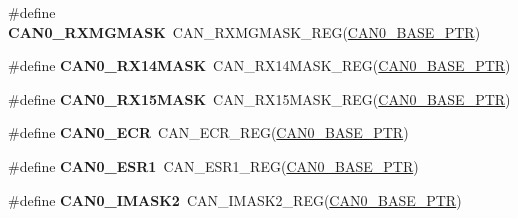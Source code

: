 \begin{DoxyCompactItemize}
\item 
\hypertarget{group___c_a_n___register___accessor___macros_gae7f04079ef57decb7b0b43b704239ba2}{}\#define {\bfseries C\+A\+N0\+\_\+\+R\+X\+M\+G\+M\+A\+S\+K}~C\+A\+N\+\_\+\+R\+X\+M\+G\+M\+A\+S\+K\+\_\+\+R\+E\+G(\hyperlink{group___c_a_n___peripheral_ga1ee8f499e10af9b8e3132e0168e519b9}{C\+A\+N0\+\_\+\+B\+A\+S\+E\+\_\+\+P\+T\+R})\label{group___c_a_n___register___accessor___macros_gae7f04079ef57decb7b0b43b704239ba2}

\item 
\hypertarget{group___c_a_n___register___accessor___macros_gaec0eee2119e6a8629942406dc321a657}{}\#define {\bfseries C\+A\+N0\+\_\+\+R\+X14\+M\+A\+S\+K}~C\+A\+N\+\_\+\+R\+X14\+M\+A\+S\+K\+\_\+\+R\+E\+G(\hyperlink{group___c_a_n___peripheral_ga1ee8f499e10af9b8e3132e0168e519b9}{C\+A\+N0\+\_\+\+B\+A\+S\+E\+\_\+\+P\+T\+R})\label{group___c_a_n___register___accessor___macros_gaec0eee2119e6a8629942406dc321a657}

\item 
\hypertarget{group___c_a_n___register___accessor___macros_ga855803ccca3adf54f65e1e2c4d219680}{}\#define {\bfseries C\+A\+N0\+\_\+\+R\+X15\+M\+A\+S\+K}~C\+A\+N\+\_\+\+R\+X15\+M\+A\+S\+K\+\_\+\+R\+E\+G(\hyperlink{group___c_a_n___peripheral_ga1ee8f499e10af9b8e3132e0168e519b9}{C\+A\+N0\+\_\+\+B\+A\+S\+E\+\_\+\+P\+T\+R})\label{group___c_a_n___register___accessor___macros_ga855803ccca3adf54f65e1e2c4d219680}

\item 
\hypertarget{group___c_a_n___register___accessor___macros_gae5c1b27d66a19078c1a9bb64376d2b3f}{}\#define {\bfseries C\+A\+N0\+\_\+\+E\+C\+R}~C\+A\+N\+\_\+\+E\+C\+R\+\_\+\+R\+E\+G(\hyperlink{group___c_a_n___peripheral_ga1ee8f499e10af9b8e3132e0168e519b9}{C\+A\+N0\+\_\+\+B\+A\+S\+E\+\_\+\+P\+T\+R})\label{group___c_a_n___register___accessor___macros_gae5c1b27d66a19078c1a9bb64376d2b3f}

\item 
\hypertarget{group___c_a_n___register___accessor___macros_ga0fe27c46961bb993d85c1993bcc7717b}{}\#define {\bfseries C\+A\+N0\+\_\+\+E\+S\+R1}~C\+A\+N\+\_\+\+E\+S\+R1\+\_\+\+R\+E\+G(\hyperlink{group___c_a_n___peripheral_ga1ee8f499e10af9b8e3132e0168e519b9}{C\+A\+N0\+\_\+\+B\+A\+S\+E\+\_\+\+P\+T\+R})\label{group___c_a_n___register___accessor___macros_ga0fe27c46961bb993d85c1993bcc7717b}

\item 
\hypertarget{group___c_a_n___register___accessor___macros_ga711eb2e225261d9a6dcdae328d42812f}{}\#define {\bfseries C\+A\+N0\+\_\+\+I\+M\+A\+S\+K2}~C\+A\+N\+\_\+\+I\+M\+A\+S\+K2\+\_\+\+R\+E\+G(\hyperlink{group___c_a_n___peripheral_ga1ee8f499e10af9b8e3132e0168e519b9}{C\+A\+N0\+\_\+\+B\+A\+S\+E\+\_\+\+P\+T\+R})\label{group___c_a_n___register___accessor___macros_ga711eb2e225261d9a6dcdae328d42812f}


\end{DoxyCompactItemize}
